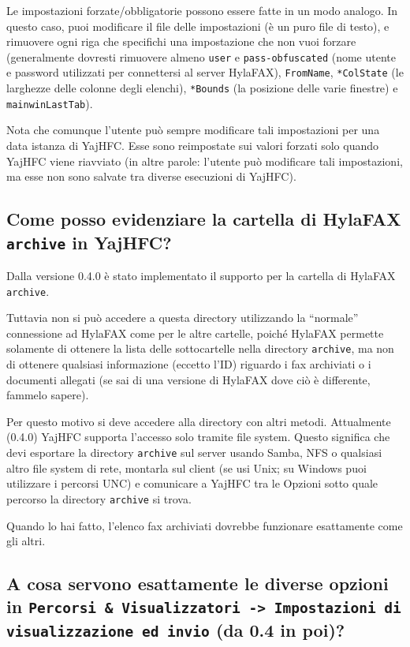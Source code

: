 \documentclass[a4paper,10pt]{scrartcl}
\begin{document}
Le impostazioni forzate/obbligatorie possono essere fatte in un modo analogo. In questo caso, puoi modificare il file delle impostazioni (è un puro file di testo), e rimuovere ogni riga che specifichi una impostazione che non vuoi forzare (generalmente dovresti rimuovere almeno \texttt{user} e \texttt{pass-obfuscated} (nome utente e password utilizzati per connettersi al server HylaFAX), \texttt{FromName}, \texttt{*ColState} (le larghezze delle colonne degli elenchi), \texttt{*Bounds} (la posizione delle varie finestre) e \texttt{mainwinLastTab}).

Nota che comunque l'utente può sempre modificare tali impostazioni per una data istanza di YajHFC. Esse sono reimpostate sui valori forzati solo quando YajHFC viene riavviato (in altre parole: l'utente può modificare tali impostazioni, ma esse non sono salvate tra diverse esecuzioni di YajHFC).


\subsection{Come posso evidenziare la cartella di HylaFAX \texttt{archive} in YajHFC?}

Dalla versione 0.4.0 è stato implementato il supporto per la cartella di HylaFAX \texttt{archive}.

Tuttavia non si può accedere a questa directory utilizzando la ``normale'' connessione ad HylaFAX come per le altre cartelle, poiché HylaFAX permette solamente di ottenere la lista delle sottocartelle nella directory \texttt{archive}, ma non di ottenere qualsiasi informazione (eccetto l'ID) riguardo i fax archiviati o i documenti allegati (se sai di una versione di HylaFAX dove ciò è differente, fammelo sapere).

Per questo motivo si deve accedere alla directory con altri metodi. Attualmente (0.4.0) YajHFC supporta l'accesso solo tramite file system. Questo significa che devi esportare la directory  \texttt{archive} sul server usando Samba, NFS o qualsiasi altro file system di rete, montarla sul client (se usi Unix; su Windows puoi utilizzare i percorsi UNC) e comunicare a YajHFC tra le Opzioni sotto quale percorso la directory \texttt{archive} si trova.

Quando lo hai fatto, l'elenco fax archiviati dovrebbe funzionare esattamente come gli altri.

\subsection{A cosa servono esattamente le diverse opzioni in \texttt{Percorsi \& Visualizzatori -> Impostazioni di visualizzazione ed invio} (da 0.4 in poi)?}
\end{document}
